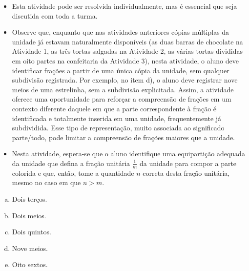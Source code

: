 \begin{multicols}{2}
\begin{orientacoes}{}{}
  \begin{itemize} %
    \item       Esta atividade pode ser resolvida individualmente, mas é essencial que seja discutida com toda a turma.
    \item       Observe que, enquanto que nas atividades anteriores cópias múltiplas da unidade já estavam naturalmente disponíveis (as duas barras de chocolate na Atividade 1, as três tortas salgadas na Atividade 2, as várias tortas divididas em oito partes na confeitaria da Atividade 3), nesta atividade, o aluno deve identificar frações a partir de uma única cópia da unidade, sem qualquer subdivisão registrada. Por exemplo, no item d), o aluno deve registrar nove meios de uma estrelinha, sem a subdivisão explicitada. Assim, a atividade oferece uma oportunidade para reforçar a compreensão de frações em um contexto diferente daquele em que a parte correspondente à fração é identificada e totalmente inserida em uma unidade, frequentemente já subdividida. Esse tipo de representação, muito associada ao significado parte/todo, pode limitar a compreensão de frações maiores que a unidade.
    \item       Nesta atividade, espera-se que o aluno identifique uma equipartição adequada da unidade que defina a fração unitária       $\frac{1}{m}$ da unidade para compor a parte colorida e que, então, tome a quantidade       $n$ correta desta fração unitária, mesmo no caso em que       $n > m$.
\end{itemize} %


\end{orientacoes}

\begin{solucao}{}{}
  \begin{enumerate}[a)]
   \item Dois terços.
   \item Dois meios.
   \item Dois quintos.
   \item Nove meios.
   \item Oito sextos.
\end{enumerate}
  \end{solucao}


\end{multicols}

